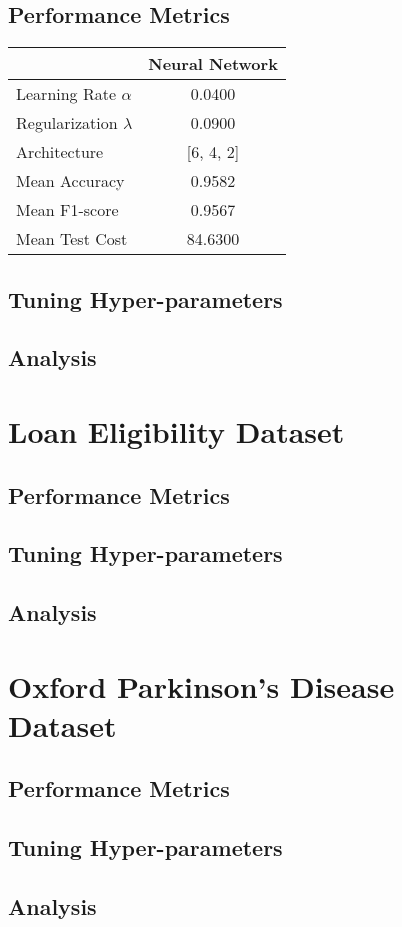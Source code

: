 \documentclass{article}
\begin{document}
\subsection*{Performance Metrics}
\begin{tabular}{lc}
    \toprule
     & Neural Network \\
    \midrule
    Learning Rate $\alpha$ & 0.0400 \\
    Regularization $\lambda$ & 0.0900 \\
    Architecture & [6, 4, 2] \\
    Mean Accuracy & 0.9582 \\
    Mean F1-score & 0.9567 \\
    Mean Test Cost & 84.6300 \\
    \bottomrule
\end{tabular}
\subsection*{Tuning Hyper-parameters}
\subsection*{Analysis}


\newpage
\section*{Loan Eligibility Dataset}
\subsection*{Performance Metrics}
\subsection*{Tuning Hyper-parameters}
\subsection*{Analysis}

\newpage
\section*{Oxford Parkinson's Disease Dataset}
\subsection*{Performance Metrics}
\subsection*{Tuning Hyper-parameters}
\subsection*{Analysis}
\end{document}
